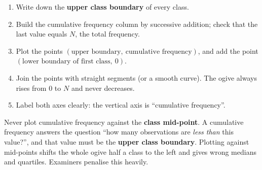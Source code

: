 \documentclass[11pt]{article}
\begin{document}
\begin{methode}
\begin{enumerate}
\item Write down the \textbf{upper class boundary} of every class.
\item Build the cumulative frequency column by successive addition; check that the last value equals $N$, the total frequency.
\item Plot the points $(\text{upper boundary},\ \text{cumulative frequency})$, and add the point $(\text{lower boundary of first class},\ 0)$.
\item Join the points with straight segments (or a smooth curve). The ogive always rises from $0$ to $N$ and never decreases.
\item Label both axes clearly: the vertical axis is ``cumulative frequency''.
\end{enumerate}
\end{methode}

\begin{attention}
Never plot cumulative frequency against the \textbf{class mid-point}. A cumulative frequency answers the question ``how many observations are \emph{less than} this value?'', and that value must be the \textbf{upper class boundary}. Plotting against mid-points shifts the whole ogive half a class to the left and gives wrong medians and quartiles. Examiners penalise this heavily.
\end{attention}
\end{document}

